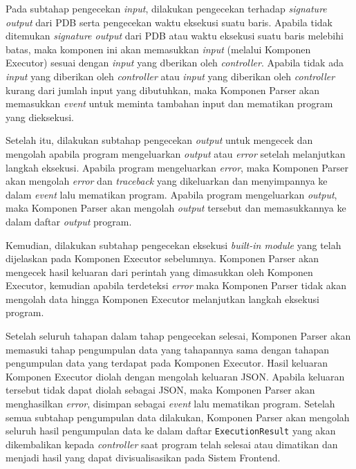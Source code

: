 Pada subtahap pengecekan \textit{input}, dilakukan pengecekan terhadap \textit{signature output} dari PDB serta pengecekan waktu eksekusi suatu baris. Apabila tidak ditemukan \textit{signature output} dari PDB atau waktu eksekusi suatu baris melebihi batas, maka komponen ini akan memasukkan \textit{input} (melalui Komponen Executor) sesuai dengan \textit{input} yang dberikan oleh \textit{controller}. Apabila tidak ada \textit{input} yang diberikan oleh \textit{controller} atau \textit{input} yang diberikan oleh \textit{controller} kurang dari jumlah input yang dibutuhkan, maka Komponen Parser akan memasukkan \textit{event} untuk meminta tambahan input dan mematikan program yang dieksekusi.

Setelah itu, dilakukan subtahap pengecekan \textit{output} untuk mengecek dan mengolah apabila program mengeluarkan \textit{output} atau \textit{error} setelah melanjutkan langkah eksekusi. Apabila program mengeluarkan \textit{error}, maka Komponen Parser akan mengolah \textit{error} dan \textit{traceback} yang dikeluarkan dan menyimpannya ke dalam \textit{event} lalu mematikan program. Apabila program mengeluarkan \textit{output}, maka Komponen Parser akan mengolah \textit{output} tersebut dan memasukkannya ke dalam daftar \textit{output} program.

Kemudian, dilakukan subtahap pengecekan eksekusi \textit{built-in module} yang telah dijelaskan pada Komponen Executor sebelumnya. Komponen Parser akan mengecek hasil keluaran dari perintah yang dimasukkan oleh Komponen Executor, kemudian apabila terdeteksi \textit{error} maka Komponen Parser tidak akan mengolah data hingga Komponen Executor melanjutkan langkah eksekusi program.

Setelah seluruh tahapan dalam tahap pengecekan selesai, Komponen Parser akan memasuki tahap pengumpulan data yang tahapannya sama dengan tahapan pengumpulan data yang terdapat pada Komponen Executor. Hasil keluaran Komponen Executor diolah dengan mengolah keluaran JSON. Apabila keluaran tersebut tidak dapat diolah sebagai JSON, maka Komponen Parser akan menghasilkan \textit{error}, disimpan sebagai \textit{event} lalu mematikan program. Setelah semua subtahap pengumpulan data dilakukan, Komponen Parser akan mengolah seluruh hasil pengumpulan data ke dalam daftar \verb|ExecutionResult| yang akan dikembalikan kepada \textit{controller} saat program telah selesai atau dimatikan dan menjadi hasil yang dapat divisualisasikan pada Sistem Frontend.


